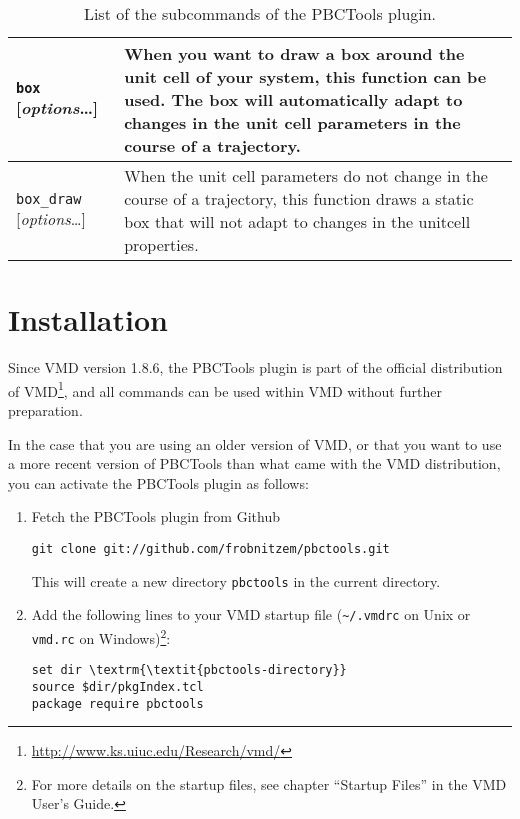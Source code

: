 \documentclass[a4paper, DIV12]{scrartcl}
\newcommand{\pbctools}{PBCTools\xspace}
\begin{document}
\begin{table}[p]
\begin{tabular}{|p{}|p{}|r|}
    \texttt{box} [\textit{options}\dots]
    & When you want to draw a box around the unit cell of your system,
    this function can be used. The box will automatically adapt to
    changes in the unit cell parameters in the course of a trajectory.
    & \pageref{sec:box}
    \\\hline
  
    \texttt{box\_draw} [\textit{options}\dots]
    & When the unit cell parameters do not change in the course of a
    trajectory, this function draws a static box that will not adapt to
    changes in the unitcell properties.
    & \pageref{sec:box_draw}
    \\\hline
  \end{tabular}
  
  \caption{List of the subcommands of the \pbctools plugin.}
  \label{tab:commands}
\end{table}

\section{Installation}

Since VMD version 1.8.6, the \pbctools plugin is part of the official
distribution of
VMD\footnote{\url{http://www.ks.uiuc.edu/Research/vmd/}}, and all
commands can be used within VMD without further preparation.

In the case that you are using an older version of VMD, or that you
want to use a more recent version of \pbctools than what came with the
VMD distribution, you can activate the \pbctools plugin as follows:

\begin{enumerate}
\item Fetch the \pbctools plugin from Github
\begin{Verbatim}
git clone git://github.com/frobnitzem/pbctools.git
\end{Verbatim}
This will create a new directory \texttt{pbctools} in the current
directory.
\item Add the following lines to your VMD startup file
  (\verb!~/.vmdrc! on Unix or \verb!vmd.rc! on Windows)\footnote{For
    more details on the startup files, see chapter ``Startup Files''
    in the VMD User's Guide.}:
\begin{Verbatim}
set dir \textrm{\textit{pbctools-directory}}
source $dir/pkgIndex.tcl
package require pbctools
\end{Verbatim}
\end{enumerate}
\end{document}
